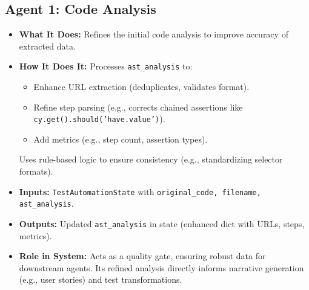 \documentclass{article}
\begin{document}
\subsection{Agent 1: Code Analysis}
\begin{itemize}
    \item \textbf{What It Does:} Refines the initial code analysis to improve accuracy of extracted data.
    \item \textbf{How It Does It:} Processes \texttt{ast\_analysis} to:
        \begin{itemize}
            \item Enhance URL extraction (deduplicates, validates format).
            \item Refine step parsing (e.g., corrects chained assertions like \texttt{cy.get().should('have.value')}).
            \item Add metrics (e.g., step count, assertion types).
        \end{itemize}
        Uses rule-based logic to ensure consistency (e.g., standardizing selector formats).
    \item \textbf{Inputs:} \texttt{TestAutomationState} with \texttt{original\_code, filename, ast\_analysis}.
    \item \textbf{Outputs:} Updated \texttt{ast\_analysis} in state (enhanced dict with URLs, steps, metrics).
    \item \textbf{Role in System:} Acts as a quality gate, ensuring robust data for downstream agents. Its refined analysis directly informs narrative generation (e.g., user stories) and test transformations.
\end{itemize}
\end{document}

